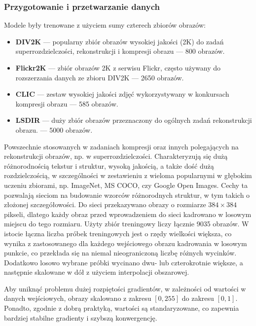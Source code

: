\subsubsection{Przygotowanie i przetwarzanie danych}
Modele były trenowane z użyciem sumy czterech zbiorów obrazów:
\begin{itemize}
	\item{\textbf{DIV2K}} --- popularny zbiór obrazów wysokiej jakości (2K) do zadań superrozdzielczości, rekonstrukcji i kompresji obrazu --- 800 obrazów.
	\item{\textbf{Flickr2K}} --- zbiór obrazów 2K z serwisu Flickr, często używany do rozszerzania danych ze zbioru DIV2K --- 2650 obrazów.
	\item{\textbf{CLIC}} --- zestaw wysokiej jakości zdjęć wykorzystywany w konkursach kompresji obrazu --- 585 obrazów.
	\item{\textbf{LSDIR}} --- duży zbiór obrazów przeznaczony do ogólnych zadań rekonstrukcji obrazu. --- 5000 obrazów.
\end{itemize}
Powszechnie stosowanych w zadaniach kompresji oraz innych polegających na rekonstrukcji obrazów, np. w superrozdzielczości. Charakteryzują się dużą różnorodnością tekstur i struktur, wysoką jakością, a także dość dużą rozdzielczością, w szczególności w zestawieniu z wieloma popularnymi w głębokim uczeniu zbiorami, np. ImageNet, MS COCO, czy Google Open Images. Cechy ta pozwalają sieciom na budowanie wzorców różnorodnych struktur, w tym takich o złożonej szczegółowości. Do sieci przekazywano obrazy o rozmiarze \( 384 \times 384 \) pikseli, dlatego każdy obraz przed wprowadzeniem do sieci kadrowano w losowym miejscu do tego rozmiaru. Użyty zbiór treningowy liczy łącznie 9035 obrazów. W istocie łączna liczba próbek treningowych jest o rzędy wielkości większa, co wynika z zastosowanego dla każdego wejściowego obrazu kadrowania w losowym punkcie, co przekłada się na niemal nieograniczoną liczbę różnych wycinków. Dodatkowo losowo wybrane próbki wycinano dwu- lub czterokrotnie większe, a następnie skalowane w dół z użyciem interpolacji obszarowej.

Aby uniknąć problemu dużej rozpiętości gradientów, w zależności od wartości w danych wejściowych, obrazy skalowano z zakresu \( \left[ 0, 255 \right]\) do zakresu \( \left[ 0, 1 \right]\). Ponadto, zgodnie z dobrą praktyką, wartości są standaryzowane, co zapewnia bardziej stabilne gradienty i szybszą konwergencję\cite{ioffe2015batchnormalizationacceleratingdeep}.


